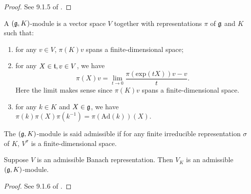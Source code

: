 \begin{proof}
See 9.1.5 of .
\end{proof}

\begin{definition}
A $(\mathfrak g,K)$-module is a vector space $V$ together with representations $\pi$ of $\mathfrak g$ and $K$ such that:
\begin{enumerate}
  \item for any $v\in V$, $\pi(K)v$ spans a finite-dimensional space;
  \item for any $X\in \mathfrak t, v\in V$, we have 
  \[
  \pi(X)v=\mathop{\mathrm {lim}}\limits_{t\to 0} \frac {\pi (\mathrm {exp} (tX))v-v} t. 
  \]
  Here the limit makes sense since $\pi(K)v$ spans a finite-dimensional space.
  \item for any $k\in K$ and $X\in \mathfrak g$, we have $\pi(k)\pi (X)\pi (k^{-1})=\pi(\mathrm {Ad}(k))(X)$.
\end{enumerate}
The $(\mathfrak g, K)$-module is said admissible if for any finite irreducible representation $\sigma$ of $K$, $V^\sigma$ is a finite-dimensional space.  
\end{definition}

\begin{proposition}
Suppose $V$ is an admissible Banach representation. Then $V_K$ is an admissible $(\mathfrak g,K)$-module. 
\end{proposition}

\begin{proof}
See 9.1.6 of .
\end{proof}
